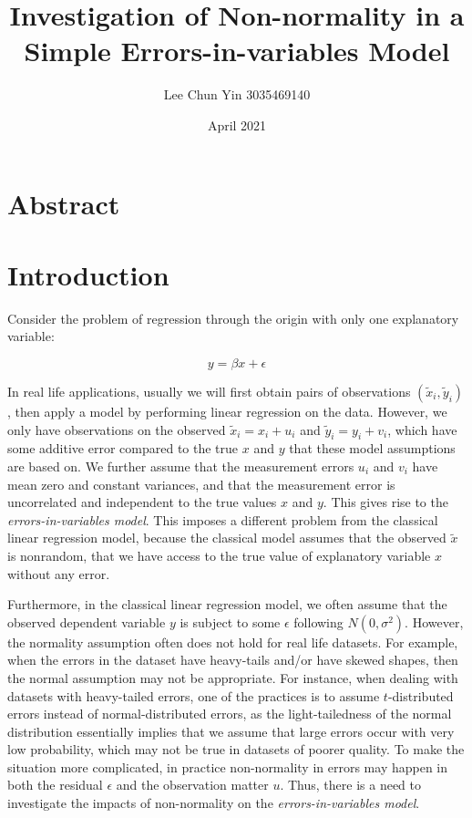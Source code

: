 \documentclass{article}
\title{Investigation of Non-normality in a Simple Errors-in-variables Model}
\author{Lee Chun Yin 3035469140}
\date{April 2021}
\begin{document}
\maketitle

\section{Abstract}

\section{Introduction}

Consider the problem of regression through the origin with only one explanatory variable:

\[
y = \beta x + \epsilon
\]

In real life applications, usually we will first obtain pairs of observations $(\tilde{x}_i, \tilde{y}_i)$, then apply a model by performing linear regression on the data. However, we only have observations on the observed $\tilde{x}_i = x_i + u_i$ and $\tilde{y}_i = y_i + v_i$, which have some additive error compared to the true $x$ and $y$ that these model assumptions are based on. We further assume that the measurement errors $u_i$ and $v_i$ have mean zero and constant variances, and that the
measurement error is uncorrelated and independent to the true values $x$ and $y$. This gives rise to the \textit{errors-in-variables model}. This imposes a different problem from the classical linear regression model, because the classical model assumes that the observed $\tilde{x}$ is nonrandom, that we have access to the true value of explanatory variable $x$ without any error. 

Furthermore, in the classical linear regression model, we often assume that the observed dependent variable $y$ is subject to some $\epsilon$ following $N(0, \sigma^2)$. However, the normality assumption often does not hold for real life datasets. For example, when the errors in the dataset have heavy-tails and/or have skewed shapes, then the normal assumption may not be appropriate. For instance, when dealing with datasets with heavy-tailed errors, one of the practices is to assume
$t$-distributed errors instead of normal-distributed errors, as the light-tailedness of the normal distribution essentially implies that we assume that large errors occur with very low probability, which may not be true in datasets of poorer quality. To make the situation more complicated, in practice non-normality in errors may happen in both the residual $\epsilon$ and the observation matter $u$. Thus, there is a need to investigate the impacts of non-normality on the \textit{errors-in-variables model}. 
\end{document}
